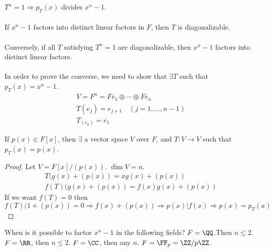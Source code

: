 \documentclass[class=scrartcl, crop=false]{standalone}
\begin{document}
\begin{example}
  $T^n = 1 \Rightarrow p_T(x)$ divides $x^n - 1$.
  \\\\
  If $x^n - 1$ factors into distinct linear factors in $F$, then $T$ is diagonalizable. 
  \\\\
  Conversely, if all $T$ satisfying $T^n = 1$ are diagonalizable, then $x^n - 1$ factors into distinct linear factors.
  \\\\
  In order to prove the converse, we need to show that $\exists T$ such that $p_T(x) = x^n - 1$.
  \begin{gather*}
    V = F^n = Fe_1 \oplus \cdots \oplus Fe_n
    \\
    T(e_j) = e_{j + 1} \quad (j = 1, \dots, n -1) \\
    T_(e_n) = e_1
  \end{gather*} 
  \begin{proposition}
    If $p(x) \in F[x]$, then $\exists $ a vector space $V$ over $F$, and $T: V \to V$ such that $p_T(x) = p(x)$.
    \begin{proof}
      Let  $V = F[x] / (p(x))$. $\dim V = n$.
      \begin{gather*}
        T(g(x) + (p(x)) = xg(x) + (p(x)) \\
        f(T)(g(x) + (p(x)) = f(x)g(x) + (p(x))
      \end{gather*} 
      If we want $f(T) = 0$ then $f(T)(1 + (p(x)) = 0 \Rightarrow f(x) + (p(x)) \Rightarrow p(x) | f(x) \Rightarrow p(x) = p_T(x)$
    \end{proof} 
  \end{proposition} 
\end{example} 
\begin{example}
  When is it possible to factor $x^n - 1$ in the following fields?
  $F = \QQ$.Then $n \leq 2$. $F = \RR$, then $n \leq 2$. $F = \CC$, then any $n$. $F = \FF_p = \ZZ / p\ZZ$.
\end{example} 
\end{document}
